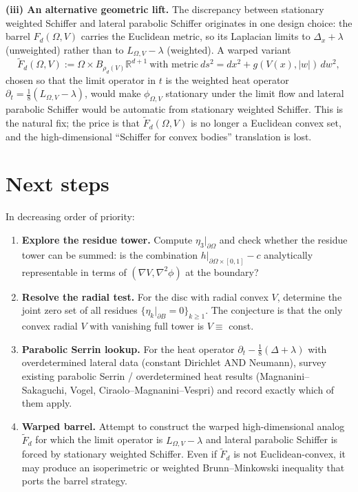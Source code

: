 \documentclass[11pt]{article}
\newcommand{\R}{\mathbb{R}}
\newcommand{\Om}{\Omega}
\newcommand{\1}{\mathbf 1}
\begin{document}
\medskip
\noindent\textbf{(iii) An alternative geometric lift.} The
discrepancy between stationary weighted Schiffer and lateral parabolic
Schiffer originates in one design choice: the barrel $F_d(\Om,V)$
carries the Euclidean metric, so its Laplacian limits to
$\Delta_x+\lambda$ (unweighted) rather than to
$L_{\Om,V}-\lambda$ (weighted). A warped variant
\[
    \widetilde F_d(\Om,V) := \Om\times B_{\rho_d(V)}\R^{d+1}
    \ \text{with metric}\ ds^2 = dx^2 + g(V(x),|w|)\,dw^2,
\]
chosen so that the limit operator in $t$ is the weighted heat
operator $\partial_t = \frac{1}{8}(L_{\Om,V}-\lambda)$, would make
$\phi_{\Om,V}$ stationary under the limit flow and lateral parabolic
Schiffer would be automatic from stationary weighted Schiffer.
This is the natural fix; the price is that
$\widetilde F_d(\Om,V)$ is no longer a Euclidean convex set, and
the high-dimensional ``Schiffer for convex bodies'' translation is
lost.

\section{Next steps}

In decreasing order of priority:

\begin{enumerate}[leftmargin=*]
    \item \textbf{Explore the residue tower.} Compute $\eta_3|_{\partial\Om}$
    and check whether the residue tower can be summed: is the
    combination $h|_{\partial\Om\times[0,1]}-c$ analytically
    representable in terms of $(\nabla V,\nabla^2\phi)$ at the
    boundary?
    \item \textbf{Resolve the radial test.} For the disc with radial
    convex $V$, determine the joint zero set of all residues
    $\{\eta_k|_{\partial B}=0\}_{k\ge 1}$. The conjecture is that the
    only convex radial $V$ with vanishing full tower is $V\equiv$
    const.
    \item \textbf{Parabolic Serrin lookup.} For the heat operator
    $\partial_t-\tfrac{1}{8}(\Delta+\lambda)$ with overdetermined
    lateral data (constant Dirichlet AND Neumann), survey existing
    parabolic Serrin / overdetermined heat results
    (Magnanini--Sakaguchi, Vogel, Ciraolo--Magnanini--Vespri) and
    record exactly which of them apply.
    \item \textbf{Warped barrel.} Attempt to construct the warped
    high-dimensional analog $\widetilde F_d$ for which the limit
    operator is $L_{\Om,V}-\lambda$ and lateral parabolic Schiffer is
    forced by stationary weighted Schiffer. Even if $\widetilde F_d$
    is not Euclidean-convex, it may produce an isoperimetric or
    weighted Brunn--Minkowski inequality that ports the barrel
    strategy.
\end{enumerate}
\end{document}
